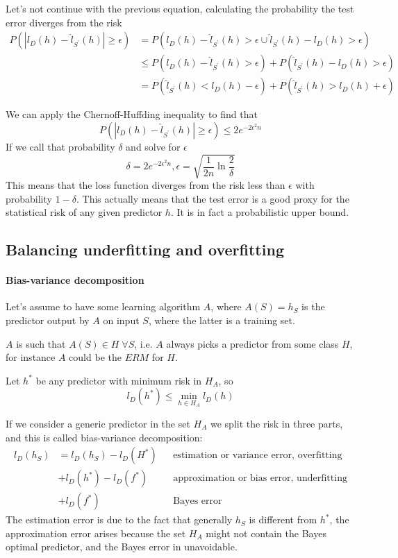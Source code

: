 Let's not continue with the previous equation, calculating the probability the 
test error diverges from the risk
\begin{equation}
    \begin{aligned}
        P(|l_D(h) - \hat{l}_{S^\prime}(h)| \geq \epsilon) 
        &= P(l_D(h) - \hat{l}_{S^\prime}(h) > \epsilon \cup
        \hat{l}_{S^\prime}(h) - l_D(h) > \epsilon)\\
        &\leq P(l_D(h) - \hat{l}_{S^\prime}(h) > \epsilon) +
        P(\hat{l}_{S^\prime}(h) - l_D(h) > \epsilon)\\
        &= P(\hat{l}_{S^\prime}(h) < l_D(h) - \epsilon) +
        P(\hat{l}_{S^\prime}(h) > l_D(h) + \epsilon)
    \end{aligned}
\end{equation}

We can apply the Chernoff-Huffding inequality to find that
 $$P(|l_D(h) - \hat{l}_{S^\prime}(h)| \geq \epsilon) \leq 2e^{-2\epsilon^2n}$$
If we call that probability $\delta$ and solve for $\epsilon$
$$\delta = 2e^{-2\epsilon^2n}, \epsilon = \sqrt{\frac{1}{2  n}\ln \frac{2}{\delta}}$$
This means that the loss function diverges from the risk less than $\epsilon$ with probability
$1-\delta$.
This actually means that the test error is a good proxy
for the statistical risk of any given predictor $h$. It is in fact a 
probabilistic upper bound.

\subsection{Balancing underfitting and overfitting}

\paragraph{Bias-variance decomposition}
Let's assume to have some learning algorithm $A$, where
$A(S) = h_S$ is the predictor output by $A$ on input $S$, where the latter 
is a training set.

$A$ is such that $A(S) \in H\;\forall S$, i.e. $A$ always picks a predictor 
from some class $H$, for instance $A$ could be the $\mathit{ERM}$ for $H$.

Let $h^*$ be any predictor with minimum risk in $H_A$, so 
$$l_D(h^*) \leq \min_{h \in H_A} l_D(h)$$

If we consider a generic predictor in the set $H_A$ we split the risk 
in three parts, and this is called bias-variance decomposition:
\begin{equation}
    \begin{aligned}
        l_D(h_S) &= l_D(h_S) - l_D(H^*) && \text{estimation or variance error, overfitting}\\
        &+ l_D(h^*) - l_D(f^*) && \text{approximation or bias error, underfitting}\\
        &+ l_D(f^*) && \text{Bayes error}
    \end{aligned}
\end{equation}
The estimation error is due to the fact that generally $h_S$ is different from 
$h^*$, the approximation error arises because the set $H_A$ might not contain
the Bayes optimal predictor, and the Bayes error in unavoidable.

